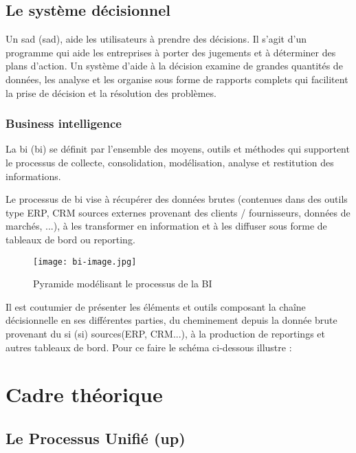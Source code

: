         \subsection[Le système décisionnel]{Le système décisionnel}
        Un \acrlong{sad} (\acrshort{sad}), aide les utilisateurs à prendre des décisions.
        Il s’agit d’un programme qui aide les entreprises à porter des jugements
        et à déterminer des plans d’action.
        Un système d’aide à la décision examine
        de grandes quantités de données, les analyse et les organise sous forme
        de rapports complets qui facilitent la prise de décision et
        la résolution des problèmes. \cite*{SAD}
            \subsubsection[Business intelligence]{Business intelligence}
            La \acrlong{bi} (\acrshort{bi}) se définit par l'ensemble des moyens,
            outils et méthodes qui supportent le processus de collecte, consolidation,
            modélisation, analyse et restitution des informations.
            \par
            Le processus de \acrshort{bi} vise à récupérer des données brutes
            (contenues dans des outils type ERP, CRM sources externes provenant
            des clients / fournisseurs, données de marchés, ...), à les transformer
            en information et à les diffuser sous forme de tableaux
            de bord ou reporting.
            \par
            \begin{figure}[h]
                \centering
                \texttt{[image: bi-image.jpg]}
                \caption{ Pyramide modélisant le processus de la BI}
                \label{fig:pyramideBi}
            \end{figure}
            Il est coutumier de présenter les éléments et outils composant
            la chaîne décisionnelle en ses différentes parties, du cheminement
            depuis la donnée brute provenant du \acrlong{si} (\acrshort{si})
            sources(ERP, CRM...), à la production de reportings et autres tableaux
            de bord. Pour ce faire le schéma ci-dessous illustre :

    \section[Cadre théorique]{Cadre théorique}
        \subsection[Le Processus Unifié (UP)]{Le Processus Unifié (\acrshort{up})}
